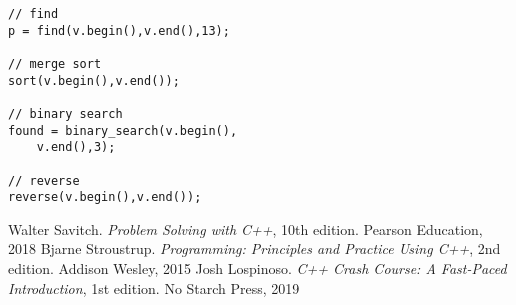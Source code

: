 \documentclass[10pt]{article}
\begin{document}
\begin{multicols*}{3}
\begin{lstlisting}
// find
p = find(v.begin(),v.end(),13);

// merge sort
sort(v.begin(),v.end());

// binary search
found = binary_search(v.begin(),
    v.end(),3);

// reverse
reverse(v.begin(),v.end());
\end{lstlisting}
%
%
\small
\begin{thebibliography}{99}
 Walter Savitch. \textsl{Problem Solving with C++}, 10th edition. Pearson Education, 2018
 Bjarne Stroustrup. \textsl{Programming: Principles and Practice Using C++}, 2nd edition. Addison Wesley, 2015
 Josh Lospinoso. \textsl{C++ Crash Course: A Fast-Paced Introduction}, 1st edition. No Starch Press, 2019
\end{thebibliography}
\end{multicols*}
\end{document}
